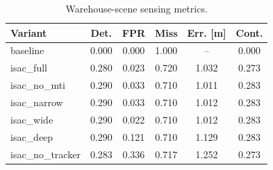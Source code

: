 \begin{table}[t]
    \centering
    \caption{Warehouse-scene sensing metrics.}
    \label{tab:exp1_wh_sense}
    \footnotesize
    \begin{tabular}{lccccc}
        \hline
        Variant           & Det.  & FPR   & Miss  & Err. [m] & Cont. \\
        \hline
        baseline          & 0.000 & 0.000 & 1.000 & --       & 0.000 \\
        isac\_full        & 0.280 & 0.023 & 0.720 & 1.032    & 0.273 \\
        isac\_no\_mti     & 0.290 & 0.033 & 0.710 & 1.011    & 0.283 \\
        isac\_narrow      & 0.290 & 0.033 & 0.710 & 1.012    & 0.283 \\
        isac\_wide        & 0.290 & 0.022 & 0.710 & 1.012    & 0.283 \\
        isac\_deep        & 0.290 & 0.121 & 0.710 & 1.129    & 0.283 \\
        isac\_no\_tracker & 0.283 & 0.336 & 0.717 & 1.252    & 0.273 \\
        \hline
    \end{tabular}
\end{table}